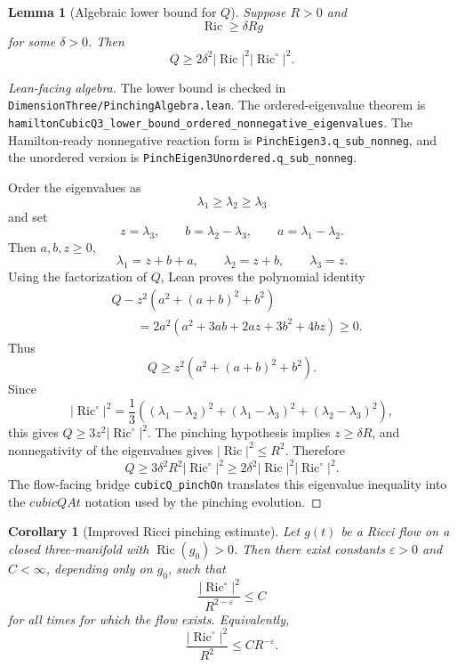 \documentclass[11pt]{article}
\theoremstyle{plain}
\newtheorem{lemma}[theorem]{Lemma}
\newtheorem{corollary}[theorem]{Corollary}
\theoremstyle{definition}
\theoremstyle{remark}
\newcommand{\Ric}{\operatorname{Ric}}
\newcommand{\norm}[1]{\left|#1\right|}
\newcommand{\eps}{\varepsilon}
\newcommand{\del}{\delta}
\newcommand{\leanref}[1]{\nolinkurl{#1}}
\newcommand{\leanfile}[1]{\nolinkurl{#1}}
\newcommand{\rffile}[1]{\leanfile{#1}}
\begin{document}
\begin{lemma}[Algebraic lower bound for $Q$]
\label{lem:Q-lower-bound}
Suppose $R>0$ and
\[
\Ric\ge\del Rg
\]
for some $\del>0$. Then
\[
Q\ge 2\del^2\norm{\Ric}^2\norm{\Ric^\circ}^2.
\]
\end{lemma}

\begin{proof}[Lean-facing algebra]
The lower bound is checked in
\rffile{DimensionThree/PinchingAlgebra.lean}.  The ordered-eigenvalue theorem
is \leanref{hamiltonCubicQ3_lower_bound_ordered_nonnegative_eigenvalues}.  The
Hamilton-ready nonnegative reaction form is \leanref{PinchEigen3.q_sub_nonneg},
and the unordered version is \leanref{PinchEigen3Unordered.q_sub_nonneg}.

Order the eigenvalues as
\[
  \lambda_1\ge\lambda_2\ge\lambda_3
\]
and set
\[
  z=\lambda_3,
  \qquad
  b=\lambda_2-\lambda_3,
  \qquad
  a=\lambda_1-\lambda_2.
\]
Then \(a,b,z\ge0\),
\[
  \lambda_1=z+b+a,
  \qquad
  \lambda_2=z+b,
  \qquad
  \lambda_3=z.
\]
Using the factorization of \(Q\), Lean proves the polynomial identity
\begin{align*}
&Q-z^2\left(a^2+(a+b)^2+b^2\right) \\
&\qquad
=
2a^2\left(a^2+3ab+2az+3b^2+4bz\right)
\ge0.
\end{align*}
Thus
\[
  Q\ge z^2\left(a^2+(a+b)^2+b^2\right).
\]
Since
\[
\norm{\Ric^\circ}^2
=
\frac13\left(
(\lambda_1-\lambda_2)^2
+(\lambda_1-\lambda_3)^2
+(\lambda_2-\lambda_3)^2
\right),
\]
this gives \(Q\ge3z^2\norm{\Ric^\circ}^2\).  The pinching hypothesis implies
\(z\ge\delta R\), and nonnegativity of the eigenvalues gives
\(\norm{\Ric}^2\le R^2\).  Therefore
\[
Q
\ge
3\delta^2 R^2\norm{\Ric^\circ}^2
\ge
2\delta^2\norm{\Ric}^2\norm{\Ric^\circ}^2.
\]
The flow-facing bridge \leanref{cubicQ_pinchOn} translates this eigenvalue
inequality into the \(cubicQAt\) notation used by the pinching evolution.
\end{proof}

\begin{corollary}[Improved Ricci pinching estimate]
\label{cor:improved-ricci-pinching}
Let $g(t)$ be a Ricci flow on a closed three-manifold with $\Ric(g_0)>0$.
Then there exist constants $\eps>0$ and $C<\infty$, depending only on $g_0$,
such that
\[
\frac{\norm{\Ric^\circ}^2}{R^{2-\eps}}\le C
\]
for all times for which the flow exists.
Equivalently,
\[
\frac{\norm{\Ric^\circ}^2}{R^2}\le CR^{-\eps}.
\]
\end{corollary}
\end{document}
